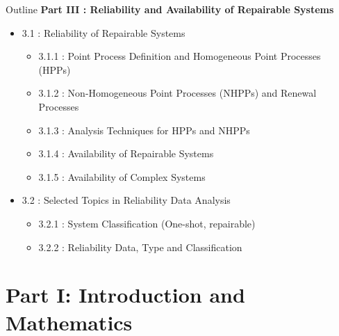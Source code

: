 \documentclass{beamer}
\begin{document}
\begin{frame}{Outline}
\small
\textbf{Part III : Reliability and Availability of Repairable Systems}
\begin{itemize}
\item 3.1 : Reliability of Repairable Systems
\begin{itemize}
\item 3.1.1 : Point Process Definition and Homogeneous Point Processes (HPPs)
\item 3.1.2 : Non-Homogeneous Point Processes (NHPPs) and Renewal Processes
\item 3.1.3 : Analysis Techniques for HPPs and NHPPs
\item 3.1.4 : Availability of Repairable Systems
\item 3.1.5 : Availability of Complex Systems
\end{itemize}
\item 3.2 : Selected Topics in Reliability Data Analysis
\begin{itemize}
\item 3.2.1 : System Classification (One-shot, repairable)
\item 3.2.2 : Reliability Data, Type and Classification
\end{itemize}
\end{itemize}
\end{frame}

\section{Part I: Introduction and Mathematics}
\end{document}

